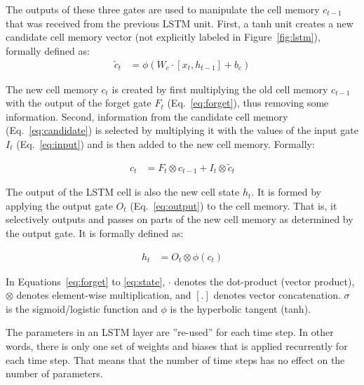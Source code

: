 The outputs of these three gates are used to manipulate the cell memory $c_{t-1}$ that was received from the previous LSTM unit. First, a tanh unit creates a new candidate cell memory vector (not explicitly labeled in Figure~\ref{fig:lstm}), formally defined as:
\begin{align}
\tilde{c}_t &= \phi (W_c \cdot [ x_t, h_{t-1}] + b_c) \label{eq:candidate}
\end{align}

The new cell memory $c_t$ is created by first multiplying the old cell memory $c_{t-1}$ with the output of the forget gate $F_t$ (Eq.~\ref{eq:forget}), thus removing some information. Second, information from the candidate cell memory (Eq.~\ref{eq:candidate}) is selected by multiplying it with the values of the input gate $I_t$ (Eq.~\ref{eq:input}) and is then added to the new cell memory. Formally:

\begin{align}
c_t &= F_t \otimes c_{t-1} + I_t \otimes \tilde{c}_t \label{eq:memory}
\end{align}

The output of the LSTM cell is also the new cell state $h_t$. It is formed by applying the output gate $O_t$ (Eq.~\ref{eq:output}) to the cell memory. That is, it selectively outputs and passes on parts of the new cell memory as determined by the output gate. It is formally defined as:

\begin{align}
h_t &= O_t \otimes \phi(c_t) \label{eq:state}
\end{align}

In Equations~\ref{eq:forget} to \ref{eq:state}, $\cdot$ denotes the dot-product (vector product), $\otimes$ denotes element-wise multiplication, and $[.]$ denotes vector concatenation. $\sigma$ is the sigmoid/logistic function and $\phi$ is the hyperbolic tangent (tanh).

The parameters in an LSTM layer are ''re-used'' for each time step. In other words, there is only one set of weights and biases that is applied recurrently for each time step. That means that the number of time steps has no effect on the number of parameters. 

